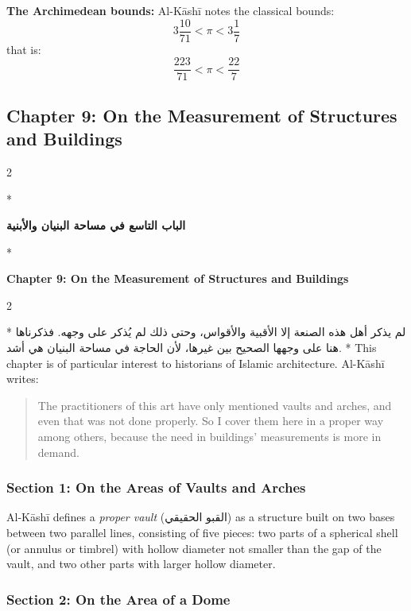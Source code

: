 \documentclass[11pt,a4paper]{article}
\newcommand{\ar}[1]{\arabicfont\beginR #1\endR}
\newenvironment{bilingual}{%
  \vspace{0.3em}%
  \begin{paracol}{2}%
}{%
  \end{paracol}%
  \vspace{0.3em}%
}
\begin{document}
\noindent\textbf{The Archimedean bounds:} Al-K\=ash\=i notes the classical
bounds:
\[
3\frac{10}{71} < \pi < 3\frac{1}{7}
\]
that is:
\[
\frac{223}{71} < \pi < \frac{22}{7}
\]

\subsection{Chapter 9: On the Measurement of Structures and Buildings}

\begin{bilingual}
\switchcolumn[0]*
\begin{center}
\textbf{\color{chapcolor}\ar{الباب التاسع في مساحة البنيان والأبنية}}
\end{center}
\switchcolumn[1]*
\begin{center}
\textbf{\color{chapcolor}Chapter 9: On the Measurement of Structures and Buildings}
\end{center}
\end{bilingual}

\begin{bilingual}
\switchcolumn[0]*
\ar{لم يذكر أهل هذه الصنعة إلا الأقبية والأقواس، وحتى ذلك لم يُذكر على وجهه. فذكرناها هنا على وجهها الصحيح بين غيرها، لأن الحاجة في مساحة البنيان هي أشد.}
\switchcolumn[1]*
This chapter is of particular interest to historians of Islamic
architecture. Al-K\=ash\=i writes:

\begin{quote}
The practitioners of this art have only mentioned vaults and arches,
and even that was not done properly. So I cover them here in a proper
way among others, because the need in buildings' measurements is more in
demand.
\end{quote}
\end{bilingual}

\subsubsection{Section 1: On the Areas of Vaults and Arches}

Al-K\=ash\=i defines a \textit{proper vault} (\ar{القبو الحقيقي}) as a
structure built on two bases between two parallel lines, consisting of
five pieces: two parts of a spherical shell (or annulus or timbrel) with
hollow diameter not smaller than the gap of the vault, and two other
parts with larger hollow diameter.

\subsubsection{Section 2: On the Area of a Dome}
\end{document}
